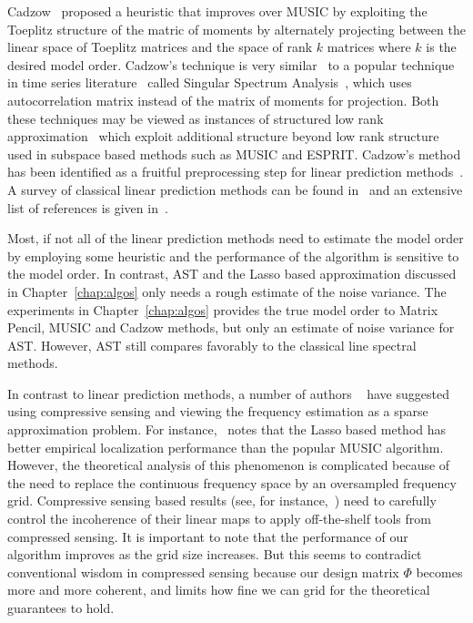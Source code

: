 Cadzow~\cite{cadzow02} proposed a heuristic that improves over MUSIC by
exploiting the Toeplitz structure of the matric of moments by alternately
projecting between the linear space of Toeplitz matrices and the space of rank
$k$ matrices where $k$ is the desired model order. Cadzow's technique is very
similar~\cite{ssa_special_issue} to a popular technique in time series
literature~\cite{tsbook1,tsbook2} called Singular Spectrum Analysis~\cite{ssa},
which uses autocorrelation matrix instead of the matrix of moments for
projection. Both these techniques may be viewed as instances of structured low
rank approximation~\cite{chu2003structured} which exploit additional structure
beyond low rank structure used in subspace based methods such as MUSIC and
ESPRIT. Cadzow's method has been identified as a fruitful preprocessing step for
linear prediction methods~\cite{blu08}. A survey of classical linear prediction
methods can be found in~\cite{blu08,StoicaMoses} and an extensive list of
references is given in~\cite{stoica93}.

Most, if not all of the linear prediction methods need to estimate the model
order by employing some heuristic and the performance of the algorithm is
sensitive to the model order. In contrast, AST and the Lasso based approximation
discussed in Chapter~\ref{chap:algos} only needs a rough estimate of the noise
variance. The experiments in Chapter~\ref{chap:algos} provides the true model
order to Matrix Pencil, MUSIC and Cadzow methods, but only an estimate of noise
variance for AST. However, AST still compares favorably to the classical line
spectral methods.

In contrast to linear prediction methods, a number of authors
~\cite{chen98spectrum,malioutov05,bourguignon2007irregular}
have suggested using compressive sensing and viewing the frequency estimation
as a sparse approximation problem. For instance,~\cite{malioutov05} notes that
the Lasso based method has better empirical localization performance than the
popular MUSIC algorithm. However, the theoretical analysis of this phenomenon
is complicated because of the need to replace the continuous frequency space by
an oversampled frequency grid. Compressive sensing based results (see, for
instance,~\cite{duartescs}) need to carefully control the incoherence of their
linear maps to apply off-the-shelf tools from compressed sensing. It is
important to note that the performance of our algorithm improves as the grid
size increases. But this seems to contradict conventional wisdom in compressed
sensing because our design matrix $\Phi$ becomes more and more coherent, and
limits how fine we can grid for the theoretical guarantees to hold.


